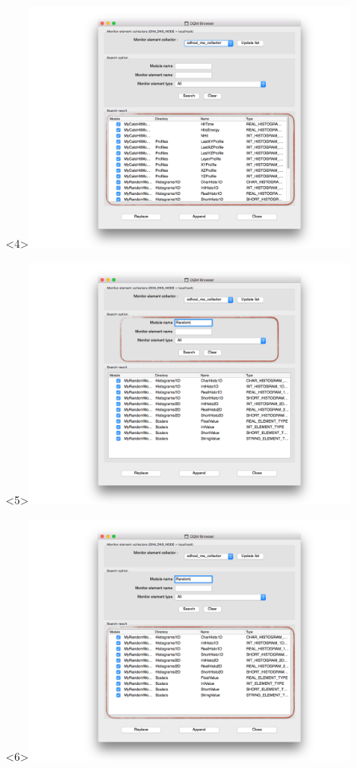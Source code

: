 \documentclass[8pt]{beamer}
\begin{document}
\begin{frame}
\begin{overlayarea}{\textwidth}{\textheight}
\begin{center}
         \begin{onlyenv}<4>\includegraphics[width=0.8\textwidth]{figs/Browser/Browser_FullList}\end{onlyenv}
         \begin{onlyenv}<5>\includegraphics[width=0.8\textwidth]{figs/Browser/Browser_Search}\end{onlyenv}
         \begin{onlyenv}<6>\includegraphics[width=0.8\textwidth]{figs/Browser/Browser_SearchResult}\end{onlyenv}

\end{center}
\end{overlayarea}
\end{frame}
\end{document}

